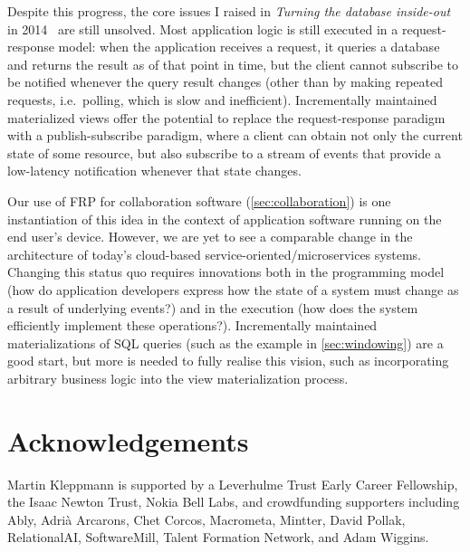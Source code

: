 \documentclass[sigconf]{acmart}
\begin{document}
Despite this progress, the core issues I raised in \emph{Turning the database inside-out} in 2014~\cite{InsideOut} are still unsolved.
Most application logic is still executed in a request-response model: when the application receives a request, it queries a database and returns the result as of that point in time, but the client cannot subscribe to be notified whenever the query result changes (other than by making repeated requests, i.e.\ polling, which is slow and inefficient).
Incrementally maintained materialized views offer the potential to replace the request-response paradigm with a publish-subscribe paradigm, where a client can obtain not only the current state of some resource, but also subscribe to a stream of events that provide a low-latency notification whenever that state changes.

Our use of FRP for collaboration software (\autoref{sec:collaboration}) is one instantiation of this idea in the context of application software running on the end user's device.
However, we are yet to see a comparable change in the architecture of today's cloud-based service-oriented/microservices systems.
Changing this status quo requires innovations both in the programming model (how do application developers express how the state of a system must change as a result of underlying events?) and in the execution (how does the system efficiently implement these operations?).
Incrementally maintained materializations of SQL queries (such as the example in \autoref{sec:windowing}) are a good start, but more is needed to fully realise this vision, such as incorporating arbitrary business logic into the view materialization process.

\section*{Acknowledgements}

Martin Kleppmann is supported by a Leverhulme Trust Early Career Fellowship, the Isaac Newton Trust, Nokia Bell Labs, and crowdfunding supporters including Ably, Adri{\` a} Arcarons, Chet Corcos, Macrometa, Mintter, David Pollak, RelationalAI, SoftwareMill, Talent Formation Network, and Adam Wiggins.


{}
\end{document}
